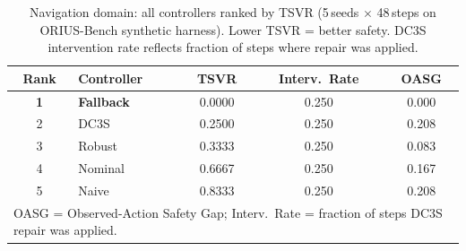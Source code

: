 \begin{table}[htbp]
\centering\small
\caption{Navigation domain: all controllers ranked by TSVR (5\,seeds $\times$ 48\,steps on ORIUS-Bench synthetic harness). Lower TSVR = better safety. DC3S intervention rate reflects fraction of steps where repair was applied.}
\label{tab:navigation_leaderboard}
\begin{tabular}{clccc}
\toprule
\textbf{Rank} & \textbf{Controller} & \textbf{TSVR} & \textbf{Interv.\ Rate} & \textbf{OASG} \\
\midrule
\textbf{1} & \textbf{Fallback} & 0.0000 & 0.250 & 0.000 \\
2 & DC3S & 0.2500 & 0.250 & 0.208 \\
3 & Robust & 0.3333 & 0.250 & 0.083 \\
4 & Nominal & 0.6667 & 0.250 & 0.167 \\
5 & Naive & 0.8333 & 0.250 & 0.208 \\
\bottomrule
\multicolumn{5}{l}{\small OASG = Observed-Action Safety Gap; Interv.\ Rate = fraction of steps DC3S repair was applied.}\\
\end{tabular}
\end{table}